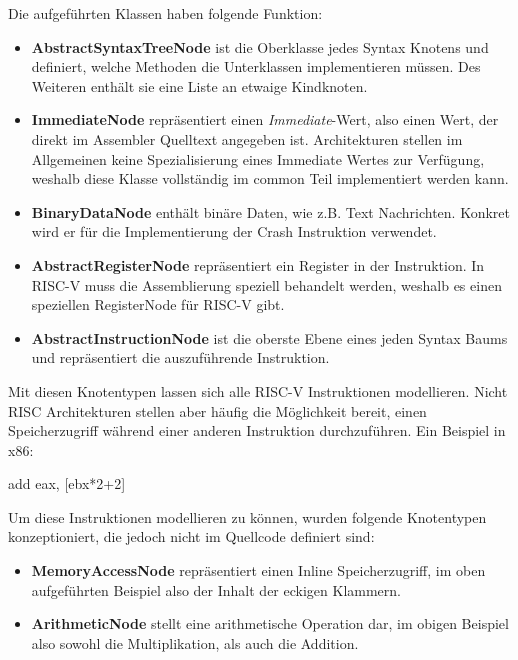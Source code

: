 \label{module-arch-ast-node-types}
Die aufgeführten Klassen haben folgende Funktion:
\begin{itemize}

  \item \textbf{AbstractSyntaxTreeNode} ist die Oberklasse jedes Syntax Knotens
  und definiert, welche Methoden die Unterklassen implementieren müssen. Des
  Weiteren enthält sie eine Liste an etwaige Kindknoten.

  \item \textbf{ImmediateNode} repräsentiert einen \emph{Immediate}-Wert, also
  einen Wert, der direkt im Assembler Quelltext angegeben ist. Architekturen
  stellen im Allgemeinen keine Spezialisierung eines Immediate Wertes zur
  Verfügung, weshalb diese Klasse vollständig im common Teil implementiert
  werden kann.

  \item \textbf{BinaryDataNode} enthält binäre Daten, wie z.B. Text Nachrichten.
  Konkret wird er für die Implementierung der Crash Instruktion verwendet.

	\item \textbf{AbstractRegisterNode} repräsentiert ein Register in der
	Instruktion. In RISC-V muss die Assemblierung speziell behandelt werden,
	weshalb es einen speziellen RegisterNode für RISC-V gibt.

	\item \textbf{AbstractInstructionNode} ist die oberste Ebene eines jeden
	Syntax Baums und repräsentiert die auszuführende Instruktion.

\end{itemize}

Mit diesen Knotentypen lassen sich alle RISC-V Instruktionen modellieren. Nicht
RISC Architekturen stellen aber häufig die Möglichkeit bereit, einen
Speicherzugriff während einer anderen Instruktion durchzuführen. Ein Beispiel in
x86:

\begin{x86}
add eax, [ebx*2+2]
\end{x86}

Um diese Instruktionen modellieren zu können, wurden folgende Knotentypen
konzeptioniert, die jedoch nicht im Quellcode definiert sind:
\begin{itemize}
	\item \textbf{MemoryAccessNode} repräsentiert einen Inline Speicherzugriff,
	im oben aufgeführten Beispiel also der Inhalt der eckigen Klammern.
	\item \textbf{ArithmeticNode} stellt eine arithmetische Operation dar, im
	obigen Beispiel also sowohl die Multiplikation, als auch die Addition.
\end{itemize}

